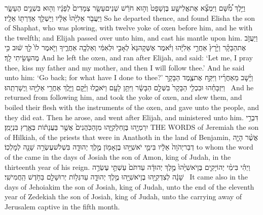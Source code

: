 {וַיֵּ֣לֶךְ מִ֠שָּׁ֠ם וַיִּמְצָ֞א אֶת\maqqaf אֱלִישָׁ֤ע בֶּן\maqqaf שָׁפָט֙ וְה֣וּא חֹרֵ֔שׁ שְׁנֵים\maqqaf עָשָׂ֤ר צְמָדִים֙ לְפָנָ֔יו וְה֖וּא בִּשְׁנֵ֣ים הֶעָשָׂ֑ר וַיַּעֲבֹ֤ר אֵלִיָּ֙הוּ֙ אֵלָ֔יו וַיַּשְׁלֵ֥ךְ אַדַּרְתּ֖וֹ אֵלָֽיו׃}
{So he departed thence, and found Elisha the son of Shaphat, who was plowing, with twelve yoke of oxen before him, and he with the twelfth; and Elijah passed over unto him, and cast his mantle upon him.}
{וַיַּעֲזֹ֣ב אֶת\maqqaf הַבָּקָ֗ר וַיָּ֙רׇץ֙ אַחֲרֵ֣י אֵלִיָּ֔הוּ וַיֹּ֗אמֶר אֶשְּׁקָה\maqqaf נָּא֙ לְאָבִ֣י וּלְאִמִּ֔י וְאֵלְכָ֖ה אַחֲרֶ֑יךָ וַיֹּ֤אמֶר לוֹ֙ לֵ֣ךְ שׁ֔וּב כִּ֥י מֶה\maqqaf עָשִׂ֖יתִי לָֽךְ׃}
{And he left the oxen, and ran after Elijah, and said: ‘Let me, I pray thee, kiss my father and my mother, and then I will follow thee.’ And he said unto him: ‘Go back; for what have I done to thee?’}
{וַיָּ֨שׇׁב מֵאַחֲרָ֜יו וַיִּקַּ֣ח אֶת\maqqaf צֶ֧מֶד הַבָּקָ֣ר וַיִּזְבָּחֵ֗הוּ וּבִכְלִ֤י הַבָּקָר֙ בִּשְּׁלָ֣ם הַבָּשָׂ֔ר וַיִּתֵּ֥ן לָעָ֖ם וַיֹּאכֵ֑לוּ וַיָּ֗קׇם וַיֵּ֛לֶךְ אַחֲרֵ֥י אֵלִיָּ֖הוּ וַֽיְשָׁרְתֵֽהוּ׃ \petucha }
{And he returned from following him, and took the yoke of oxen, and slew them, and boiled their flesh with the instruments of the oxen, and gave unto the people, and they did eat. Then he arose, and went after Elijah, and ministered unto him.}
\newperek
{}
\label{haft_42}
\setcounter{chap}{1}
\setcounter{verse}{1}
{דִּבְרֵ֥י יִרְמְיָ֖הוּ בֶּן\maqqaf חִלְקִיָּ֑הוּ מִן\maqqaf הַכֹּֽהֲנִים֙ אֲשֶׁ֣ר בַּעֲנָת֔וֹת בְּאֶ֖רֶץ בִּנְיָמִֽן׃}
{THE WORDS of Jeremiah the son of Hilkiah, of the priests that were in Anathoth in the land of Benjamin,}
{אֲשֶׁ֨ר הָיָ֤ה דְבַר\maqqaf יְהֹוָה֙ אֵלָ֔יו בִּימֵ֛י יֹאשִׁיָּ֥הוּ בֶן\maqqaf אָמ֖וֹן מֶ֣לֶךְ יְהוּדָ֑ה בִּשְׁלֹשׁ\maqqaf עֶשְׂרֵ֥ה שָׁנָ֖ה לְמׇלְכֽוֹ׃}
{to whom the word of the \lord\space came in the days of Josiah the son of Amon, king of Judah, in the thirteenth year of his reign.}
{וַיְהִ֗י בִּימֵ֨י יְהוֹיָקִ֤ים בֶּן\maqqaf יֹאשִׁיָּ֙הוּ֙ מֶ֣לֶךְ יְהוּדָ֔ה עַד\maqqaf תֹּם֙ עַשְׁתֵּ֣י עֶשְׂרֵ֣ה שָׁנָ֔ה לְצִדְקִיָּ֥הוּ בֶן\maqqaf יֹאשִׁיָּ֖הוּ מֶ֣לֶךְ יְהוּדָ֑ה עַד\maqqaf גְּל֥וֹת יְרוּשָׁלַ֖͏ִם בַּחֹ֥דֶשׁ הַֽחֲמִישִֽׁי׃ \petucha }
{It came also in the days of Jehoiakim the son of Josiah, king of Judah, unto the end of the eleventh year of Zedekiah the son of Josiah, king of Judah, unto the carrying away of Jerusalem captive in the fifth month.}
